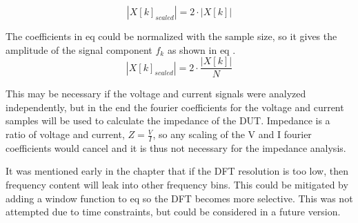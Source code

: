 \begin{equation}\label{eq:4_7_2_SA8}
    |X[k]_{scaled}| = 2 \cdot |X[k]|
\end{equation}

The coefficients in eq  could be normalized with the sample size, so it gives the amplitude of the signal component $f_k$ as shown in eq .
\begin{equation}\label{eq:4_7_2_SA9}
    |X[k]_{scaled}| = 2 \cdot \frac{|X[k]|}{N}
\end{equation}

This may be necessary if the voltage and current signals were analyzed independently, but in the end the fourier coefficients for the voltage and current samples will be used to calculate the impedance of the DUT. Impedance is a ratio of voltage and current, $Z = \frac{V}{I}$, so any scaling of the V and I fourier coefficients would cancel and it is thus not necessary for the impedance analysis.

It was mentioned early in the chapter that if the DFT resolution is too low, then frequency content will leak into other frequency bins. This could be mitigated by adding a window function to eq  so the DFT becomes more selective. This was not attempted due to time constraints, but could be considered in a future version.